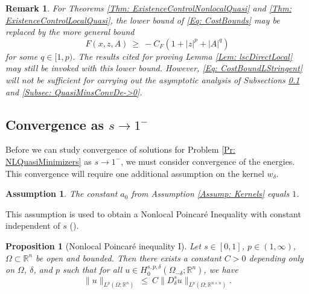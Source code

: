 \documentclass[11pt, reqno]{amsart}   	%
\theoremstyle{plain}
\numberwithin{equation}{section}
\newtheorem{assumption}[thm]{Assumption}
\newtheorem{proposition}[thm]{Proposition}
\newtheorem{remark}[thm]{Remark}
\def\de{\delta}
\def\Om{\Omega}
\def\R{\mathbb{R}}
\begin{document}
    \begin{remark}
        For Theorems \ref{Thm: ExistenceControlNonlocalQuasi} and \ref{Thm: ExistenceControlLocalQuasi}, the lower bound of \eqref{Eq: CostBounds} may be replaced by the more general bound
        \begin{equation}\label{Eq: CostBoundLStringent}
            F(x, z, A) \ \geq \ -C_F(1 + |z|^p + |A|^q)
        \end{equation}
        for some $q \in [1, p)$. The results cited for proving Lemma \ref{Lem: lscDirectLocal} may still be invoked with this lower bound. However, \eqref{Eq: CostBoundLStringent} will not be sufficient for carrying out the asymptotic analysis of Subsections \ref{Subsec: quasiMinimizersAsymptoticss->1} and \ref{Subsec: QuasiMinsConvDe->0}.
    \end{remark}


\subsection{Convergence as $s \rightarrow 1^-$}\label{Subsec: quasiMinimizersAsymptoticss->1}


Before we can study convergence of solutions for Problem \ref{Pr: NLQuasiMinimizers} as $s \rightarrow 1^-$, we must consider convergence of the energies. This convergence will require one additional assumption on the kernel $w_{\de}$.

\begin{assumption}\label{Assump: kernels->1}
    The constant $a_0$ from Assumption \ref{Assump: Kernels} equals $1$.
\end{assumption}

This assumption is used to obtain a Nonlocal Poincaré Inequality with constant independent of $s$ (\cite[Theorem 4]{cueto2023variational}).

\begin{proposition}[Nonlocal Poincaré inequality I]\label{Prop: NLPoincares}
		Let $s \in [0, 1]$, $p \in (1, \infty)$, $\Om \subset \R^n$ be open and bounded. Then there exists a constant $C > 0$ depending only on $\Om$, $\de$, and $p$ such that for all $u \in H^{s, p, \de}_0(\Om_{-\de}; \R^n)$, we have
		\begin{equation}\label{Eq: NLPoincares}
			\|u\|_{L^p(\Om; \R^n)} \ \leq \ C\|D^s_{\de}u\|_{L^p(\Om; \R^{n\times n})}.
		\end{equation}
	\end{proposition}
\end{document}
